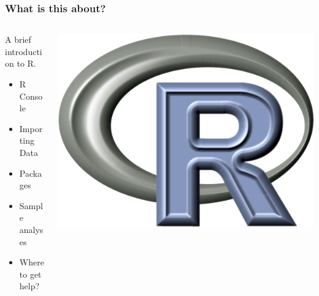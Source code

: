 \documentclass{beamer}\usepackage[]{graphicx}\usepackage[]{color}
\begin{document}
\begin{frame}
\frametitle{What is this about?}

\begin{columns}[T]
	\begin{column}{.5\textwidth}
		A brief introduction to R.
		\vspace*{10pt}
		\begin{itemize}
		\item R Console
		\item Importing Data
		\item Packages
		\item Sample analyses
		\item Where to get help?
		\end{itemize}
	\end{column}

	\begin{column}{.5\textwidth}
		\includegraphics[width=\textwidth]{./figures/R.png}
	\end{column}
\end{columns}	
\end{frame}
\end{document}
